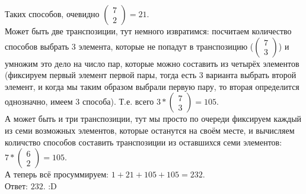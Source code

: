 \documentclass[a4paper,11pt]{report}
\begin{document}
Таких способов, очевидно $
\begin{pmatrix}
7\\
2
\end{pmatrix}
 = 21$.\\
Может быть две транспозиции, тут немного извратимся: посчитаем количество способов выбрать 3 элемента, которые не попадут в транспозицию
($\begin{pmatrix}
   7\\
   3
  \end{pmatrix}
$) и умножим это дело на число пар, которые можно составить из четырёх элементов (фиксируем первый элемент первой пары,
тогда есть 3 варианта выбрать второй элемент, и когда мы таким образом выбрали первую пару, то вторая определится однозначно, имеем 3 способа).
Т.е. всего $3 * 
\begin{pmatrix}
 7\\
 3
\end{pmatrix}
 = 105$.\\
А может быть и три транспозиции, тут мы просто по очереди фиксируем каждый из семи возможных элементов, которые останутся на своём месте,
и вычисляем количство способов составить транспозиции из оставшихся семи элементов: $7 * 
\begin{pmatrix}
6\\
2
\end{pmatrix}
 = 105$.\\
А теперь всё просуммируем: $1 + 21 + 105 + 105 = 232$.\\
Ответ: $232$. :D
\end{document}
